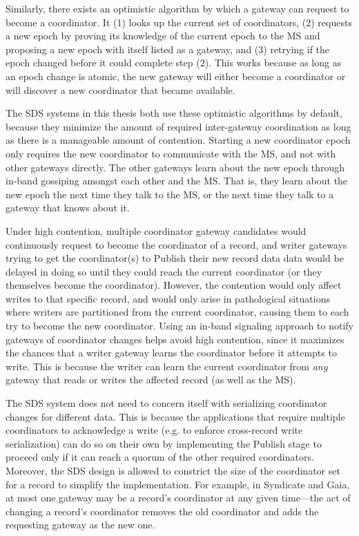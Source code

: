 Similarly, there exists an optimistic algorithm by which a gateway can request
to become a coordinator.  It (1) looks up the current set of coordinators, (2)
requests a new epoch by proving its knowledge of the current epoch to the MS
and proposing a new epoch with itself listed as a gateway, and (3) retrying if the epoch
changed before it could complete step (2).  This works because as long as an epoch change
is atomic, the new gateway will either become a coordinator or will discover a
new coordinator that became available.

The SDS systems in this thesis both use these optimistic algorithms by
default, because they minimize the amount of required inter-gateway coordination
as long as there is a manageable amount of contention.
Starting a new coordinator epoch only requires the new coordinator to communicate with the MS, and not with
other gateways directly.  The other gateways learn about the new epoch through
in-band gossiping amongst each
other and the MS.  That is, they learn about the new epoch the next time they talk to
the MS, or the next time they talk to a gateway that knows about it.

Under high contention, multiple coordinator gateway candidates would continuously request
to become the coordinator of a record, and writer gateways trying to get the
coordinator(s) to Publish their new record data
data would be delayed in doing so until they could reach the current coordinator (or they
themselves become the coordinator).  However, the contention would only affect
writes to that specific record, and would only arise in pathological situations
where writers are partitioned from the current coordinator, causing
them to each try to become the new coordinator.
Using an in-band signaling approach to notify gateways of
coordinator changes helps avoid high contention, since it maximizes
the chances that a writer gateway learns the coordinator before it attempts to
write.  This is because the writer can learn the current coordinator 
from \emph{any} gateway that reads or writes the affected record (as well as the
MS).

The SDS system does not need to concern itself with serializing coordinator
changes for different data.  This is because the applications that require
multiple coordinators to acknowledge a write (e.g. to enforce cross-record write
serialization) can do so on their own by implementing the
Publish stage to proceed only if it can reach a quorum of the other required
coordinators.  Moreover, the SDS design is allowed to constrict the size
of the coordinator set for a record to simplify the implementation.
For example, in Syndicate and Gaia, at most one gateway may be a record's coordinator
at any given time---the act of changing a record's coordinator removes the old
coordinator and adds the requesting gateway as the new one.

